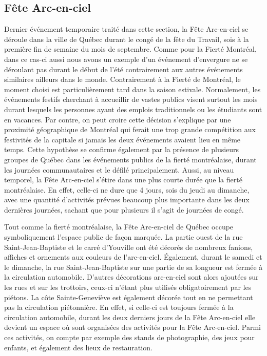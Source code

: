 \subsection{Fête Arc-en-ciel}
\label{subsec:fetearcenciel}
Dernier événement temporaire traité dans cette section, la Fête Arc-en-ciel se déroule dans la ville de Québec durant le congé de la fête du Travail, sois à la première fin de semaine du mois de septembre.
Comme pour la Fierté Montréal, dans ce cas-ci aussi nous avons un exemple d'un événement d'envergure ne se déroulant pas durant le début de l'été contrairement aux autres événements similaires ailleurs dans le monde.
Contrairement à la Fierté de Montréal, le moment choisi est particulièrement tard dans la saison estivale.
Normalement, les événements festifs cherchant à accueillir de vastes publics visent surtout les mois durant lesquels les personnes ayant des emplois traditionnels ou les étudiants sont en vacances.
Par contre, on peut croire cette décision s'explique par une proximité géographique de Montréal qui ferait une trop grande compétition aux festivités de la capitale si jamais les deux événements avaient lieu en même temps.
Cette hypothèse se confirme également par la présence de plusieurs groupes de Québec dans les événements publics de la fierté montréalaise, durant les journées communautaires et le défilé principalement.
Aussi, au niveau temporel, la Fête Arc-en-ciel s'étire dans une plus courte durée que la fierté montréalaise.
En effet, celle-ci ne dure que 4 jours, sois du jeudi au dimanche, avec une quantité d'activités prévues beaucoup plus importante dans les deux dernières journées, sachant que pour plusieurs il s'agit de journées de congé.

Tout comme la fierté montréalaise, la Fête Arc-en-ciel de Québec occupe symboliquement l'espace public de façon marquée. 
La partie ouest de la rue Saint-Jean-Baptiste et le carré d'Youville ont été décorés de nombreux fanions, affiches et ornements aux couleurs de l'arc-en-ciel.
Également, durant le samedi et le dimanche, la rue Saint-Jean-Baptiste sur une partie de sa longueur est fermée à la circulation automobile.
D'autres décorations arc-en-ciel sont alors ajoutées sur les rues et sur les trottoirs, ceux-ci n'étant plus utilisés obligatoirement par les piétons.
La côte Sainte-Geneviève est également décorée tout en ne permettant pas la circulation piétonnière.
En effet, si celle-ci est toujours fermée à la circulation automobile, durant les deux derniers jours de la Fête Arc-en-ciel elle devient un espace où sont organisées des activités pour la Fête Arc-en-ciel. Parmi ces activités, on compte par exemple des stands de photographie, des jeux pour enfants, et également des lieux de restauration.

